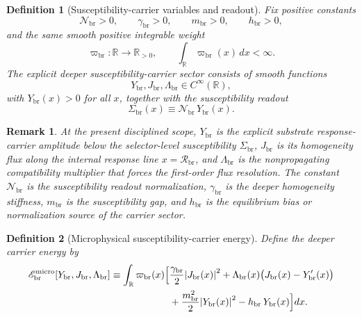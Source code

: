 \documentclass[11pt]{article}
\newcommand{\BridgeCurv}{\mathcal R_{\mathrm{br}}}
\newcommand{\ProfWeight}{\varpi_{\mathrm{br}}}
\newcommand{\RespSus}{\Sigma_{\mathrm{br}}}
\newcommand{\RespCarrier}{Y_{\mathrm{br}}}
\newcommand{\RespFlux}{J_{\mathrm{br}}}
\newcommand{\RespCompat}{\Lambda_{\mathrm{br}}}
\newcommand{\RespNorm}{\mathcal N_{\mathrm{br}}}
\newcommand{\RespFluxCoeff}{\gamma_{\mathrm{br}}}
\newcommand{\RespGap}{m_{\mathrm{br}}}
\newcommand{\RespBias}{h_{\mathrm{br}}}
\newcommand{\RespMicroEnergy}{\mathscr E_{\mathrm{br}}^{\mathrm{micro}}}
\newtheorem{definition}{Definition}
\newtheorem{remark}{Remark}
\begin{document}
\begin{definition}[Susceptibility-carrier variables and readout]
\label{def:carrier}
Fix positive constants
\begin{equation}
\RespNorm>0,
\qquad
\RespFluxCoeff>0,
\qquad
\RespGap>0,
\qquad
\RespBias>0,
\label{eq:microconstants}
\end{equation}
and the same smooth positive integrable weight
\begin{equation}
\ProfWeight:\mathbb R\to\mathbb R_{>0},
\qquad
\int_{\mathbb R}\ProfWeight(x)\,dx<\infty.
\label{eq:weight}
\end{equation}
The \emph{explicit deeper susceptibility-carrier sector} consists of smooth functions
\begin{equation}
\RespCarrier,\RespFlux,\RespCompat\in C^\infty(\mathbb R),
\label{eq:carrierfields}
\end{equation}
with \(\RespCarrier(x)>0\) for all \(x\), together with the susceptibility readout
\begin{equation}
\RespSus(x)\equiv \RespNorm\,\RespCarrier(x).
\label{eq:readoutsigma}
\end{equation}
\end{definition}

\begin{remark}
At the present disciplined scope, \(\RespCarrier\) is the explicit substrate response-carrier amplitude below the selector-level susceptibility \(\RespSus\), \(\RespFlux\) is its homogeneity flux along the internal response line \(x=\BridgeCurv\), and \(\RespCompat\) is the nonpropagating compatibility multiplier that forces the first-order flux resolution. The constant \(\RespNorm\) is the susceptibility readout normalization, \(\RespFluxCoeff\) is the deeper homogeneity stiffness, \(\RespGap\) is the susceptibility gap, and \(\RespBias\) is the equilibrium bias or normalization source of the carrier sector.
\end{remark}

\begin{definition}[Microphysical susceptibility-carrier energy]
\label{def:microenergy}
Define the deeper carrier energy by
\begin{align}
\RespMicroEnergy[\RespCarrier,\RespFlux,\RespCompat]
\equiv
\int_{\mathbb R}\ProfWeight(x)\Bigl[
&\frac{\RespFluxCoeff}{2}\abs{\RespFlux(x)}^2
+\RespCompat(x)\bigl(\RespFlux(x)-\RespCarrier'(x)\bigr)
\nonumber\\
&+\frac{\RespGap^2}{2}\abs{\RespCarrier(x)}^2
-\RespBias\,\RespCarrier(x)
\Bigr]dx.
\label{eq:microenergy}
\end{align}
\end{definition}
\end{document}
